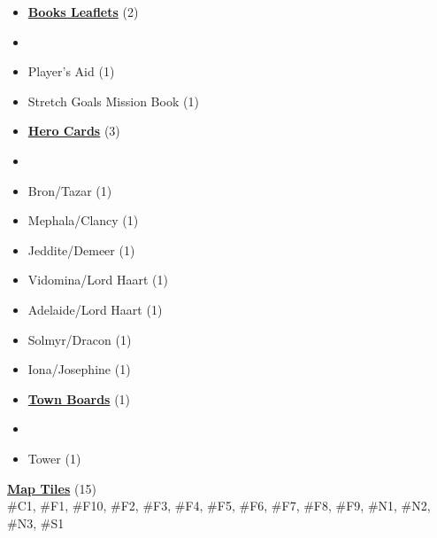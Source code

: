 
\begin{multicols}{3}

\footnotesize

\begin{itemize}[leftmargin=0pt, label={}, noitemsep, noitemsep]
  \item \textbf{\small{\underline{Books Leaflets}}} (2)
  \item
  \item Player's Aid (1)
  \item Stretch Goals Mission Book (1)
\end{itemize}

\begin{itemize}[leftmargin=0pt, label={}, noitemsep, noitemsep]
  \item \textbf{\small{\underline{Hero Cards}}} (3)
  \item
  \item Bron/Tazar (1)
  \item Mephala/Clancy (1)
  \item Jeddite/Demeer (1)
  \item Vidomina/Lord Haart (1)
  \item Adelaide/Lord Haart (1)
  \item Solmyr/Dracon (1)
  \item Iona/Josephine (1)
\end{itemize}

\begin{itemize}[leftmargin=0pt, label={}, noitemsep, noitemsep]
  \item \textbf{\small{\underline{Town Boards}}} (1)
  \item
  \item Tower (1)
\end{itemize}

\textbf{\small{\underline{Map Tiles}}} (15)\\

\#C1, \#F1, \#F10, \#F2, \#F3, \#F4, \#F5, \#F6, \#F7, \#F8, \#F9, \#N1, \#N2, \#N3, \#S1


\end{multicols}
